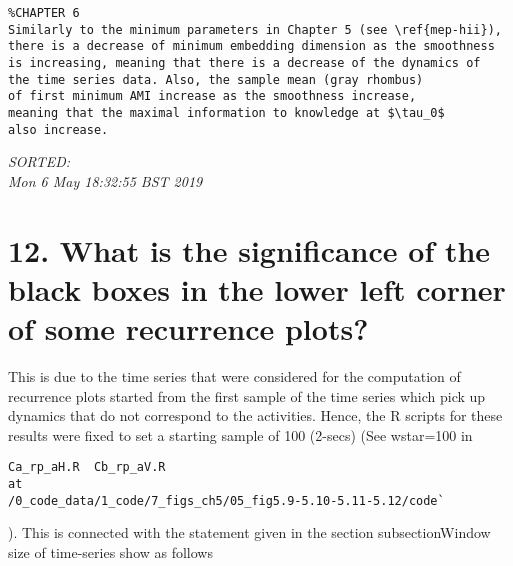 \documentclass[12pt]{article}
\begin{document}
\begin{enumerate}
\begin{verbatim}
%CHAPTER 6
Similarly to the minimum parameters in Chapter 5 (see \ref{mep-hii}),
there is a decrease of minimum embedding dimension as the smoothness 
is increasing, meaning that there is a decrease of the dynamics of 
the time series data. Also, the sample mean (gray rhombus) 
of first minimum AMI increase as the smoothness increase,
meaning that the maximal information to knowledge at $\tau_0$ 
also increase.

	\end{verbatim}
	\textit{
	SORTED:  \\
	Mon  6 May 18:32:55 BST 2019
	}
	\\














\end{enumerate}




%
%
%
%


\section*{12. 
What is the significance of the black boxes 
in the lower left corner of some recurrence plots?
}


This is due to the time series that were considered for the 
computation of recurrence plots started from the first sample of the
time series which pick up dynamics that do not correspond to 
the activities. Hence, the R scripts for these results were fixed to set a 
starting sample of 100 (2-secs)
(See wstar=100 in 
\begin{verbatim}
Ca_rp_aH.R  Cb_rp_aV.R
at
/0_code_data/1_code/7_figs_ch5/05_fig5.9-5.10-5.11-5.12/code`
\end{verbatim}).
This is connected with the statement given in the
section subsection{Window size of time-series} show as follows
\end{document}
